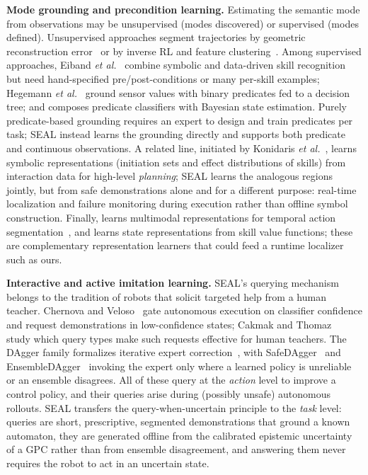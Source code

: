 \textbf{Mode grounding and precondition learning.} Estimating the semantic mode from observations may be unsupervised (modes discovered) or supervised (modes defined). Unsupervised approaches segment trajectories by geometric reconstruction error~\cite{shi2023waypointbased} or by inverse RL and feature clustering~\cite{hierarchical}. Among supervised approaches, Eiband \emph{et al.}~\cite{eiband_online_2023} combine symbolic and data-driven skill recognition but need hand-specified pre/post-conditions or many per-skill examples; Hegemann \emph{et al.}~\cite{hegemann_learning_2022} ground sensor values with binary predicates fed to a decision tree; and \cite{9811675} composes predicate classifiers with Bayesian state estimation. Purely predicate-based grounding requires an expert to design and train predicates per task; SEAL instead learns the grounding directly and supports both predicate and continuous observations. A related line, initiated by Konidaris \emph{et al.}~\cite{konidaris2018skills}, learns symbolic representations (initiation sets and effect distributions of skills) from interaction data for high-level \emph{planning}; SEAL learns the analogous regions jointly, but from safe demonstrations alone and for a different purpose: real-time localization and failure monitoring during execution rather than offline symbol construction. Finally, \cite{sliwowski_m2r2_2025} learns multimodal representations for temporal action segmentation~\cite{TAS}, and \cite{shah2022value} learns state representations from skill value functions; these are complementary representation learners that could feed a runtime localizer such as ours.

\textbf{Interactive and active imitation learning.} SEAL's querying mechanism belongs to the tradition of robots that solicit targeted help from a human teacher. Chernova and Veloso~\cite{chernova2009confidence} gate autonomous execution on classifier confidence and request demonstrations in low-confidence states; Cakmak and Thomaz~\cite{cakmak2012designing} study which query types make such requests effective for human teachers. The DAgger family formalizes iterative expert correction~\cite{ross2011dagger}, with SafeDAgger~\cite{zhang2017safedagger} and EnsembleDAgger~\cite{menda2019ensembledagger} invoking the expert only where a learned policy is unreliable or an ensemble disagrees. All of these query at the \emph{action} level to improve a control policy, and their queries arise during (possibly unsafe) autonomous rollouts. SEAL transfers the query-when-uncertain principle to the \emph{task} level: queries are short, prescriptive, segmented demonstrations that ground a known automaton, they are generated offline from the calibrated epistemic uncertainty of a GPC rather than from ensemble disagreement, and answering them never requires the robot to act in an uncertain state.

